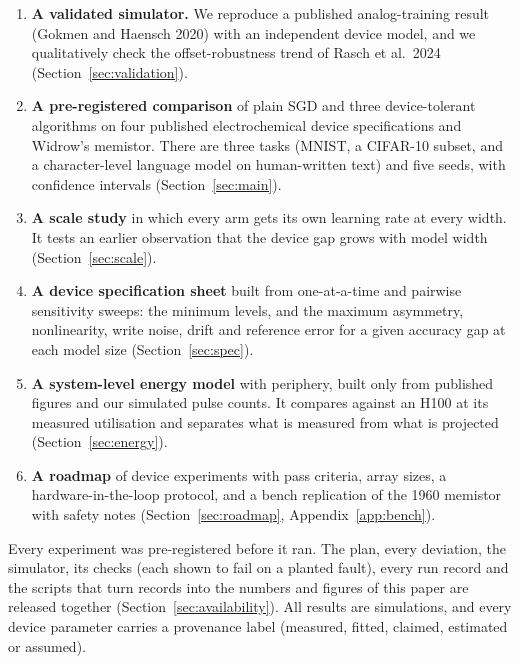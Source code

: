 \begin{enumerate}
\item \textbf{A validated simulator.} We reproduce a published analog-training result (Gokmen and Haensch 2020) with an
      independent device model, and we qualitatively check the offset-robustness trend of Rasch et al.\ 2024
      (Section~\ref{sec:validation}).
\item \textbf{A pre-registered comparison} of plain SGD and three device-tolerant algorithms on four published electrochemical
      device specifications and Widrow's memistor. There are three tasks (MNIST, a CIFAR-10 subset, and a character-level language
      model on human-written text) and five seeds, with confidence intervals (Section~\ref{sec:main}).
\item \textbf{A scale study} in which every arm gets its own learning rate at every width. It tests an earlier observation that
      the device gap grows with model width (Section~\ref{sec:scale}).
\item \textbf{A device specification sheet} built from one-at-a-time and pairwise sensitivity sweeps: the minimum levels, and
      the maximum asymmetry, nonlinearity, write noise, drift and reference error for a given accuracy gap at each model size
      (Section~\ref{sec:spec}).
\item \textbf{A system-level energy model} with periphery, built only from published figures and our simulated pulse counts. It
      compares against an H100 at its measured utilisation and separates what is measured from what is projected
      (Section~\ref{sec:energy}).
\item \textbf{A roadmap} of device experiments with pass criteria, array sizes, a hardware-in-the-loop protocol, and a bench
      replication of the 1960 memistor with safety notes (Section~\ref{sec:roadmap}, Appendix~\ref{app:bench}).
\end{enumerate}

Every experiment was pre-registered before it ran. The plan, every deviation, the simulator, its checks (each shown to fail on a
planted fault), every run record and the scripts that turn records into the numbers and figures of this paper are released
together (Section~\ref{sec:availability}). All results are simulations, and every device parameter carries a provenance label
(measured, fitted, claimed, estimated or assumed).
